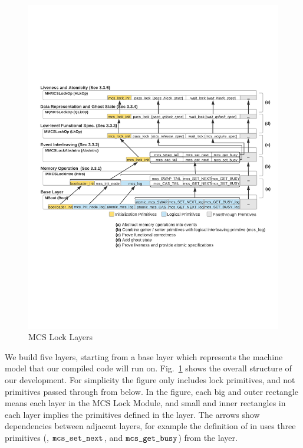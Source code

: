 \begin{figure}
\begin{center}
\includegraphics[width=\linewidth]{figs/mcslock/layer_overview}
\end{center}
\caption{MCS Lock Layers}
\label{fig:layeroverview}
\end{figure}

We build five layers, starting from a base
layer which represents the machine model that our compiled code will
run on.
Fig.~\ref{fig:layeroverview} shows the overall structure of our development.
For simplicity the figure only includes lock primitives, and not
primitives passed through from below.
In the figure, each big and outer rectangle means each layer in the MCS Lock Module, 
and small and inner rectangles in each layer implies the primitives defined in the layer.
The arrows show dependencies between adjacent layers,
for example the definition of  in 
uses three primitives (,
${\mathrm{\texttt{mcs$\_$set$\_$next}}}$, and ${\mathrm{\texttt{mcs$\_$get$\_$busy}}}$) from the  layer.

